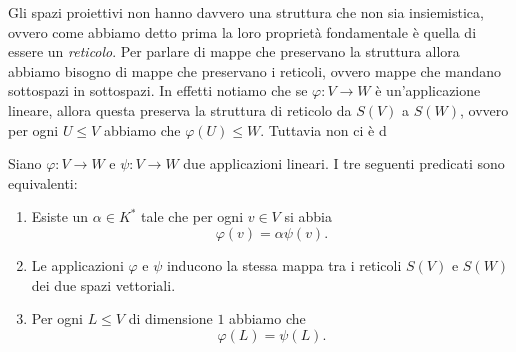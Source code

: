 \documentclass[11pt]{scrartcl}
\begin{document}
   	 Gli spazi proiettivi non hanno davvero una struttura che non sia insiemistica, ovvero come abbiamo detto prima la loro proprietà fondamentale è quella di essere un \textit{reticolo}. Per parlare di mappe che preservano la struttura allora abbiamo bisogno di mappe che preservano i reticoli, ovvero mappe che mandano sottospazi in sottospazi. In effetti notiamo che se $\varphi:V\to W$ è un'applicazione lineare, allora questa preserva la struttura di reticolo da $S(V)$ a $S(W)$, ovvero per ogni $U\le V$ abbiamo che $\varphi(U)\le W$. Tuttavia non ci è d
   	 \begin{proposition}
   	 	Siano $\varphi:V\to W$ e $\psi:V\to W$ due applicazioni lineari. I tre seguenti predicati sono equivalenti:
   	 	\begin{enumerate}
   	 		\item Esiste un $\alpha\in K^*$ tale che per ogni $v\in V$ si abbia
   	 		$$\varphi(v)=\alpha \psi(v).$$
   	 		\item Le applicazioni $\varphi$ e $\psi$ inducono la stessa mappa tra i reticoli $S(V)$ e $S(W)$ dei due spazi vettoriali.
   	 		\item Per ogni $L\le V$ di dimensione $1$ abbiamo che 
   	 		$$\varphi(L)=\psi(L).$$
   	 	\end{enumerate}
   	 \end{proposition}
\end{document}
